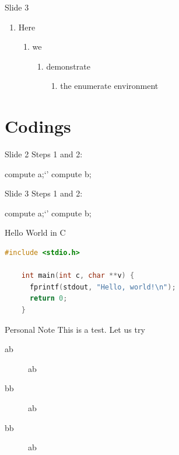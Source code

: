 \documentclass[
 size=12pt,
 paper=smartboard, %
 mode=present, %
 display=slides, %
style=tulip,
pauseslide,
fleqn,leqno,clock]{powerdot}
\begin{document}
\begin{slide}{Slide 3}
  \begin{enumerate}[type=1]
    \item<1> Here
    \begin{enumerate}
      \item<2> we
      \begin{enumerate}
        \item<3> demonstrate
        \begin{enumerate}
          \item<4> the enumerate environment
        \end{enumerate}
      \end{enumerate}
    \end{enumerate}
  \end{enumerate}
\end{slide}


\section{Codings}

\begin{slide}[method=direct]{Slide 2}
Steps 1 and 2:
\begin{code}
compute a;`\pause'
compute b;
\end{code}
\end{slide}

\begin{slide}[method=file]{Slide 3}
Steps 1 and 2:
\begin{code}
compute a;`\pause'
compute b;
\end{code}
\end{slide}


\begin{slide}[method=direct]{Hello World in C}
  \begin{lstlisting}[language=c,gobble=4]
    #include <stdio.h>

    int main(int c, char **v) {
      fprintf(stdout, "Hello, world!\n");
      return 0;
    }
  \end{lstlisting}
\end{slide}
\begin{note}{Personal Note}
 This is a test. Let us try
\begin{description}
 \item[ab] ab 
 \item[bb] ab 
 \item[bb] ab 
\end{description}
\end{note}
\end{document}

